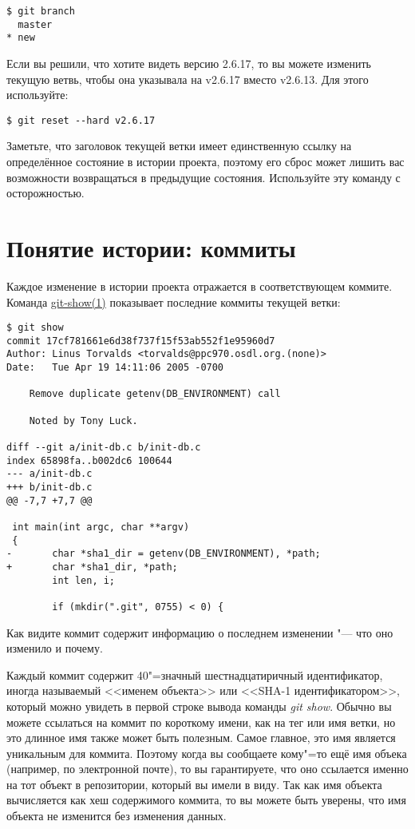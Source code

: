 \documentclass[a4paper, 12pt]{report}
\begin{document}
\begin{lstlisting}
$ git branch
  master
* new
\end{lstlisting}

Если вы решили, что хотите видеть версию 2.6.17, то вы можете изменить текущую ветвь,
чтобы она указывала на v2.6.17 вместо v2.6.13. Для этого используйте:

\begin{lstlisting}
$ git reset --hard v2.6.17
\end{lstlisting}

Заметьте, что заголовок текущей ветки имеет единственную ссылку на определённое состояние
в истории проекта, поэтому его сброс может лишить вас возможности возвращаться в
предыдущие состояния. Используйте эту команду с осторожностью.


\section{Понятие истории: коммиты}

Каждое изменение в истории проекта отражается в соответствующем коммите. Команда
\href{http://www.kernel.org/pub/software/scm/git/docs/git-show.html}{git-show(1)}
показывает последние коммиты текущей ветки:

\begin{lstlisting}
$ git show
commit 17cf781661e6d38f737f15f53ab552f1e95960d7
Author: Linus Torvalds <torvalds@ppc970.osdl.org.(none)>
Date:   Tue Apr 19 14:11:06 2005 -0700

    Remove duplicate getenv(DB_ENVIRONMENT) call

    Noted by Tony Luck.

diff --git a/init-db.c b/init-db.c
index 65898fa..b002dc6 100644
--- a/init-db.c
+++ b/init-db.c
@@ -7,7 +7,7 @@

 int main(int argc, char **argv)
 {
-       char *sha1_dir = getenv(DB_ENVIRONMENT), *path;
+       char *sha1_dir, *path;
        int len, i;

        if (mkdir(".git", 0755) < 0) {
\end{lstlisting}

Как видите коммит содержит информацию о последнем изменении "--- что оно изменило
и почему.

Каждый коммит содержит 40"=значный шестнадцатиричный идентификатор, иногда называемый
<<именем объекта>> или <<SHA-1 идентификатором>>, который можно увидеть в первой
строке вывода команды \emph{git show}. Обычно вы можете ссылаться на коммит по
короткому имени, как на тег или имя ветки, но это длинное имя также может быть
полезным. Самое главное, это имя является уникальным для коммита. Поэтому когда
вы сообщаете кому"=то ещё имя объека (например, по электронной почте), то вы
гарантируете, что оно ссылается именно на тот объект в репозитории, который вы
имели в виду. Так как имя объекта вычисляется как хеш содержимого коммита, то вы
можете быть уверены, что имя объекта не изменится без изменения данных.
\end{document}

